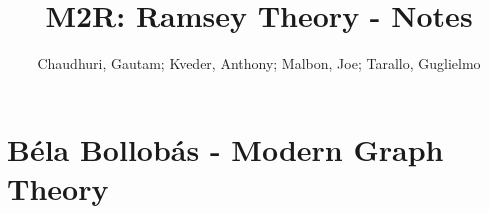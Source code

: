 \documentclass{article}
\title{M2R: Ramsey Theory - Notes}
\author{Chaudhuri, Gautam; Kveder, Anthony; Malbon, Joe; Tarallo, Guglielmo}
\begin{document}
\maketitle
\tableofcontents

\section{Béla Bollobás - Modern Graph Theory}
\label{sec:1}


\clearpage
\printbibliography
\end{document}
